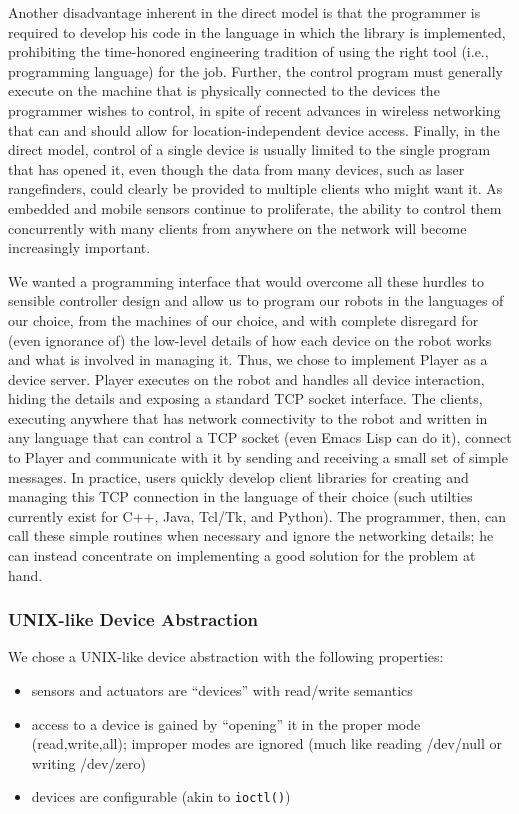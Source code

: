 \documentclass[]{article}
\begin{document}
Another disadvantage inherent in the direct model is that
the programmer is required to develop his code in
the language in which the library is implemented, prohibiting the 
time-honored engineering tradition of using the right tool (i.e.,
programming language) for the job.  Further, the control program 
must generally execute on the machine that is physically connected to the 
devices the programmer wishes to control, in spite of recent advances in 
wireless networking that can and should allow for location-independent 
device access.  Finally,  in the direct model, control of a single device
is usually limited to the single program that has opened it, even though
the data from many devices, such as laser rangefinders, could clearly 
be provided to multiple clients who might want it.
As embedded and mobile sensors continue to proliferate, the ability
to control them concurrently with many clients from anywhere on the 
network will become increasingly important.

We wanted a programming interface that would overcome all these hurdles
to sensible controller design and allow us to program our robots in 
the languages of our choice, from the machines of our choice, and with
complete disregard for (even ignorance of) the low-level details of how 
each device on the robot works and what is involved in managing it.
Thus, we chose to implement Player as a device server.  Player executes
on the robot and handles all device interaction, hiding the details and
exposing a standard TCP socket interface.  The clients, executing anywhere
that has network connectivity to the robot and written in any language
that can control a TCP socket (even Emacs Lisp can do it), connect to Player
and communicate with it by sending and receiving a small set of 
simple messages.  In practice, users quickly develop client libraries for 
creating and managing this TCP connection in the language of their choice
(such utilties currently exist for C++, Java, Tcl/Tk, and Python).  The
programmer, then, can call these simple routines when necessary and ignore 
the networking details; he can instead concentrate on implementing a good 
solution for the problem at hand.

\subsubsection{UNIX-like Device Abstraction}
We chose a UNIX-like device abstraction with the following properties:
\begin{itemize}
\item sensors and actuators are ``devices'' with read/write semantics
\item access to a device is gained by ``opening'' it in the proper mode
(read,write,all); improper modes are ignored (much like reading /dev/null
or writing /dev/zero)
\item devices are configurable (akin to {\tt ioctl()})
\end{itemize}
\end{document}
